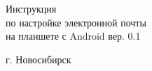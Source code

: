 

	
\begin{flushright}
\end{flushright}

\vspace{\baselineskip}
\vspace{\baselineskip}
\vspace{\baselineskip}
\vspace{\baselineskip}

\begin{center}
Инструкция\\
по настройке электронной почты \\
на планшете с Android \tiny{вер. 0.1} 
\end{center}


\begin{multicols}{2}
\flushleft г. Новосибирск
\flushright {} 
\end{multicols}

\toccontents

%
%
%
\cleardoublepage
{}
\begingroup
\renewcommand\numberline[1]{}
\emptypage\listoffigures\thispagestyle{empty} \newpage
\endgroup


%
%
%
%
%	
%	
%	


